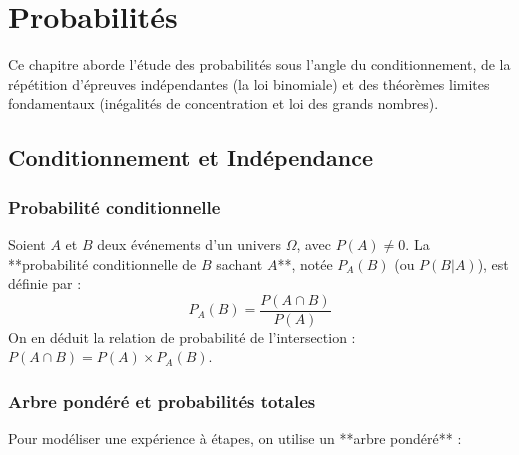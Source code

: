 \chapter{Probabilités}

Ce chapitre aborde l'étude des probabilités sous l'angle du conditionnement, de la répétition d'épreuves indépendantes (la loi binomiale) et des théorèmes limites fondamentaux (inégalités de concentration et loi des grands nombres).

\section{Conditionnement et Indépendance}

\subsection{Probabilité conditionnelle}

\begin{definition}
Soient $A$ et $B$ deux événements d'un univers $\Omega$, avec $P(A) \ne 0$.
La **probabilité conditionnelle de $B$ sachant $A$**, notée $P_A(B)$ (ou $P(B|A)$), est définie par :
\[
P_A(B) = \frac{P(A \cap B)}{P(A)}
\]
On en déduit la relation de probabilité de l'intersection : $P(A \cap B) = P(A) \times P_A(B)$.
\end{definition}

\subsection{Arbre pondéré et probabilités totales}

Pour modéliser une expérience à étapes, on utilise un **arbre pondéré** :

\begin{center}
\end{center}


